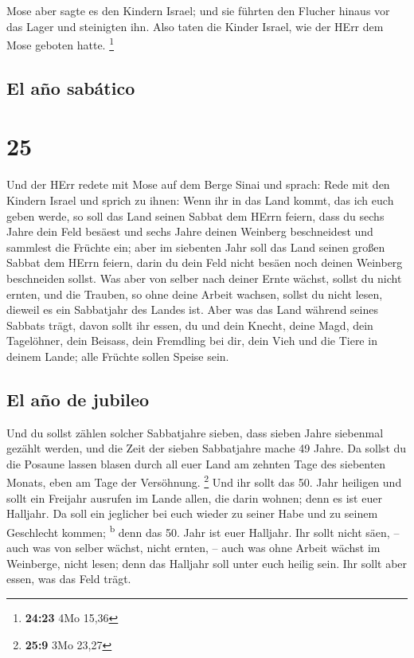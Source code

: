 Mose aber sagte es den Kindern Israel; und sie führten
den Flucher hinaus vor das Lager und steinigten ihn. Also taten die
Kinder Israel, wie der HErr dem Mose geboten hatte. \footnote{\textbf{24:23}
  4Mo 15,36}

\hypertarget{el-auxf1o-sabuxe1tico}{%
\subsection{El año sabático}\label{el-auxf1o-sabuxe1tico}}

\hypertarget{section-24}{%
\section{25}\label{section-24}}

 Und der HErr redete mit Mose auf dem Berge Sinai und
sprach:  Rede mit den Kindern Israel und sprich zu ihnen:
Wenn ihr in das Land kommt, das ich euch geben werde, so soll das Land
seinen Sabbat dem HErrn feiern,  dass du sechs Jahre dein
Feld besäest und sechs Jahre deinen Weinberg beschneidest und sammlest
die Früchte ein;  aber im siebenten Jahr soll das Land
seinen großen Sabbat dem HErrn feiern, darin du dein Feld nicht besäen
noch deinen Weinberg beschneiden sollst.  Was aber von
selber nach deiner Ernte wächst, sollst du nicht ernten, und die
Trauben, so ohne deine Arbeit wachsen, sollst du nicht lesen, dieweil es
ein Sabbatjahr des Landes ist.  Aber was das Land während
seines Sabbats trägt, davon sollt ihr essen, du und dein Knecht, deine
Magd, dein Tagelöhner, dein Beisass, dein Fremdling bei dir,
 dein Vieh und die Tiere in deinem Lande; alle Früchte
sollen Speise sein.

\hypertarget{el-auxf1o-de-jubileo}{%
\subsection{El año de jubileo}\label{el-auxf1o-de-jubileo}}

 Und du sollst zählen solcher Sabbatjahre sieben, dass
sieben Jahre siebenmal gezählt werden, und die Zeit der sieben
Sabbatjahre mache 49 Jahre.  Da sollst du die Posaune
lassen blasen durch all euer Land am zehnten Tage des siebenten Monats,
eben am Tage der Versöhnung. \footnote{\textbf{25:9} 3Mo 23,27}
 Und ihr sollt das 50. Jahr heiligen und sollt ein
Freijahr ausrufen im Lande allen, die darin wohnen; denn es ist euer
Halljahr. Da soll ein jeglicher bei euch wieder zu seiner Habe und zu
seinem Geschlecht kommen; \textsuperscript{b}  denn das
50. Jahr ist euer Halljahr. Ihr sollt nicht säen, -- auch was von selber
wächst, nicht ernten, -- auch was ohne Arbeit wächst im Weinberge, nicht
lesen;  denn das Halljahr soll unter euch heilig sein.
Ihr sollt aber essen, was das Feld trägt.

